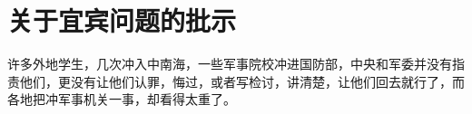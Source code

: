 \section[关于宜宾问题的批示（一九六七年四月）]{关于宜宾问题的批示}


许多外地学生，几次冲入中南海，一些军事院校冲进国防部，中央和军委并没有指责他们，更没有让他们认罪，悔过，或者写检讨，讲清楚，让他们回去就行了，而各地把冲军事机关一事，却看得太重了。


